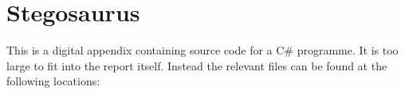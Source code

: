 \chapter{Stegosaurus}
\label{app:E}
This is a digital appendix containing source code for a C\# programme. It is too large to fit into the report itself.
Instead the relevant files can be found at the following locations:

\setlength{\parindent}{0pt} {
 \\

}